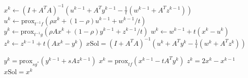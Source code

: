 \documentclass{article}
\theoremstyle{definition}
\theoremstyle{remark}
\begin{document}
\begin{algorithm}[h!]
  \label{algo:ADMM}

 {
  $ x^k \leftarrow (I+A^TA)^{-1} \left( u^{k-1} + A^T y^{k-1} - \frac{1}{t} (w^{k-1} + A^T z^{k-1} )\right) $ \;
  $ u^k \leftarrow \text{prox}_{t^{-1}f}(\rho x^k + (1-\rho)u^{k-1} +  w^{k-1}/t )$ \;
  $ y^k \leftarrow \text{prox}_{t^{-1}g}(\rho Ax^k + (1-\rho)y^{k-1} + z^{k-1}/t )$ \;
  $ w^k \leftarrow w^{k-1} + t(x^k - u^k)$ \;
  $ z^k \leftarrow z^{k-1} + t(Ax^k - y^k)$ \;
} 
\Return $x\text{Sol} =  (I+A^TA)^{-1} \left( u^{k} + A^T y^{k} - \frac{1}{t} (w^{k} + A^T z^{k} )\right) $\;
\caption{Alternating Direction Method of Multipliers (ADMM)}\label{alg: ADMM} 
\end{algorithm}
\begin{algorithm}[h!]
    \label{algo:ChambollePock}

 {
  $ y^k = \text{prox}_{sg^{*}}(y^{k - 1} + sAz^{k-1})$    \;
  $ x^k = \text{prox}_{tf}(x^{k-1} - tA^{T}y^{k})$ \;
  $	z^{k}  = 2x^{k}  - x^{k-1} $ \;
} 
\Return $x\text{Sol} = x^{k}$\;
\caption{Chambolle-Pock Algorithm}\label{alg:ChambollePock} 
\end{algorithm}
\newpage
\end{document}
